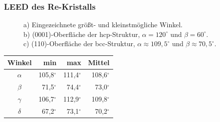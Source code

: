 \documentclass{beamer}
\begin{document}
\begin{frame}
\frametitle{LEED des Re-Kristalls}
\vspace{-0.2cm}
\begin{figure}[H]
\begin{minipage}[b]{0.45\textwidth}

\end{minipage}
\begin{minipage}[b]{0.45\textwidth}

\end{minipage}
\caption*{a) Eingezeichnete größt- und
kleinstmögliche Winkel.\\ b) (0001)-Oberfläche der hcp-Struktur, $\alpha=120^{\circ}$ und
$\beta=60^{\circ}$.\\ c) (110)-Oberfläche der bcc-Struktur, $\alpha\approx109{,}5^{\circ}$ und
$\beta\approx70{,}5^{\circ}$.}
\end{figure}
\vspace{-0.5cm}
\small\begin{table}[H]
\centering
\begin{tabular}{ c  r  r  r}
Winkel &	min	 &	max & Mittel \\
 \hline                       
 $\alpha$&105,8$^{\circ}$&111,4$^{\circ}$&108,6$^{\circ}$\\
 $\beta$&71,5$^{\circ}$&74,4$^{\circ}$&73,0$^{\circ}$\\
 $\gamma$&106,7$^{\circ}$&112,9$^{\circ}$&109,8$^{\circ}$\\
 $\delta$&67,2$^{\circ}$&73,1$^{\circ}$&70,2$^{\circ}$\\
\end{tabular}
\end{table}
\end{frame}
\end{document}
